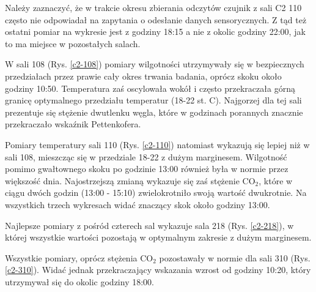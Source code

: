 Należy zaznaczyć, że w trakcie okresu zbierania odczytów czujnik z sali C2 110 często nie odpowiadał na zapytania 
o odesłanie danych sensorycznych. Z tąd też ostatni pomiar na wykresie jest z godziny 18:15 a nie z okolic godziny 
22:00, jak to ma miejsce w pozostałych salach.

W sali 108 (Rys. \ref{c2-108}) pomiary wilgotności utrzymywały się w bezpiecznych przedziałach przez prawie cały
okres trwania badania, oprócz skoku około godziny 10:50. Temperatura zaś oscylowała wokół i często przekraczała
górną granicę optymalnego przedziału temperatur (18-22 st. C). Najgorzej dla tej sali prezentuje się stężenie dwutlenku węgla,
które w godzinach porannych znacznie przekraczało wskaźnik Pettenkofera.

Pomiary temperatury sali 110 (Rys. \ref{c2-110}) natomiast wykazują się lepiej niż w sali 108, mieszcząc się w przedziale 18-22 z dużym
marginesem. Wilgotność pomimo gwałtownego skoku po godzinie 13:00 również była w normie przez większość dnia.
Najostrzejszą zmianą wykazuje się zaś stężenie CO$_2$, które w ciągu dwóch godzin (13:00 - 15:10) zwielokrotniło
swoją wartość dwukrotnie. Na wszystkich trzech wykresach widać znaczący skok około godziny 13:00.

Najlepsze pomiary z pośród czterech sal wykazuje sala 218 (Rys. \ref{c2-218}), w której wszystkie wartości pozostają w optymalnym
zakresie z dużym marginesem.

Wszystkie pomiary, oprócz stężenia CO$_2$ pozostawały w normie dla sali 310 (Rys. \ref{c2-310}). Widać jednak przekraczający wskazania
wzrost od godziny 10:20, który utrzymywał się do okolic godziny 18:00.

